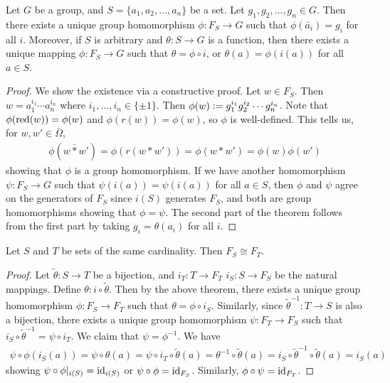 \begin{theorem}
    Let $G$ be a group, and $S = \{a_{1},a_{2},\ldots,a_{n}\}$ be a set. Let $g_{1},g_{2},\ldots,g_{n} \in G$. Then there exists a unique group homomorphism $\phi:F_{S} \to G$ such that $\phi(\bar{a}_{i}) = g_{i}$ for all $i$. Moreover, if $S$ is arbitrary and $\theta:S \to G$ is a function, then there exists a unique mapping $\phi:F_{S} \to G$ such that $\theta = \phi \circ i$, or $\theta(a) = \phi(i(a))$ for all $a \in S$.
\end{theorem}
\begin{proof}
    We show the existence via a constructive proof. Let $w \in F_{S}$. Then $w = a_{1}^{i_{1}} \cdots a_{n}^{i_{n}}$ where $i_{1},\ldots,i_{n} \in \{\pm 1\}$. Then $\phi(w) \vcentcolon= g_{1}^{i_{1}} g_{2}^{i_{2}} \cdots g_{n}^{i_{n}}$. Note that $\phi(\operatorname{red}(w)) = \phi(w)$ and $\phi(r(w)) = \phi(w)$, so $\phi$ is well-defined. This tells us, for $w,w' \in \bar{\Omega}$,
    \begin{align}
        \phi(w \bar{\ast} w') = \phi(r(w \ast w')) = \phi(w \ast w') = \phi(w) \phi(w')
    \end{align}
    showing that $\phi$ is a group homomorphism. If we have another homomorphism $\psi:F_{S} \to G$ such that $\psi(i(a)) = \psi(i(a))$ for all $a \in S$, then $\phi$ and $\psi$ agree on the generators of $F_{S}$ since $i(S)$ generates $F_{S}$, and both are group homomorphisms showing that $\phi = \psi$. The second part of the theorem follows from the first part by taking $g_{i} = \theta(a_{i})$ for all $i$.
\end{proof}

\begin{proposition}
    Let $S$ and $T$ be sets of the same cardinality. Then $F_{S} \cong F_{T}$.
\end{proposition}

\begin{proof}
    Let $\tilde{\theta}:S \to T$ be a bijection, and $i_{T} :T \to F_{T}$ $i_{S}:S \to F_{S}$ be the natural mappings. Define $\theta:i \circ \tilde{\theta}$. Then by the above theorem, there exists a unique group homomorphism $\phi:F_{S} \to F_{T}$ such that $\theta = \phi \circ i_{S}$. Similarly, since $\tilde{\theta}^{-1}:T \to S$ is also a bijection, there exists a unique group homomorphism $\psi:F_{T} \to F_{S}$ such that $i_{S} \circ \tilde{\theta}^{-1} = \psi \circ i_{T}$. We claim that $\psi = \phi^{-1}$. We have
    \begin{align}
        \psi \circ \phi(i_{S}(a)) = \psi \circ \theta (a) = \psi \circ i_{T} \circ \tilde{\theta}(a) = \theta^{-1} \circ \tilde{\theta}(a) = i_{S} \circ \tilde{\theta}^{-1} \circ \tilde{\theta}(a) = i_{S}(a)
    \end{align}
    showing $\psi \circ \phi|_{i(S)} = \operatorname{id}_{i(S)}$ or $\psi \circ \phi = \operatorname{id}_{F_{S}}$. Similarly, $\phi \circ \psi = \operatorname{id}_{F_{T}}$.
\end{proof}